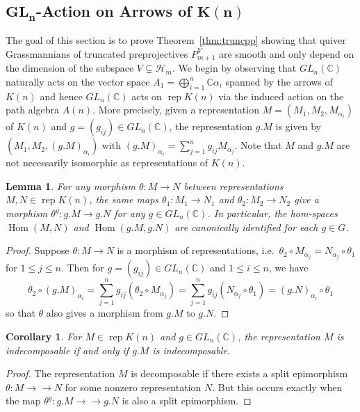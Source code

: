 \documentclass{amsart}
\newtheorem{corollary}[theorem]{Corollary}
\newtheorem{lemma}[theorem]{Lemma}
\numberwithin{equation}{section}
\newcommand{\CC}{\mathbb{C}}
\newcommand{\cH}{\mathcal{H}}
\newcommand{\onto}{\to\!\!\!\!\!\to}
\newcommand{\Hom}{\operatorname{Hom}}
\newcommand{\rep}{\operatorname{rep}}
\begin{document}
\subsection{\texorpdfstring{$\mathbf{GL_n}$}{Gln}-Action on Arrows of \texorpdfstring{$\mathbf{K(n)}$}{K(n)}}
The goal of this section is to prove Theorem~\ref{thm:truncpp} showing that quiver Grassmannians of truncated preprojectives $P_{m+1}^V$ are smooth and only depend on the dimension of the subspace $V\subsetneq \cH_m$.
We begin by observing that $GL_n(\CC)$ naturally acts on the vector space $A_1=\bigoplus_{i=1}^n \CC\alpha_i$ spanned by the arrows of $K(n)$ and hence $GL_n(\CC)$ acts on $\rep K(n)$ via the induced action on the path algebra $A(n)$.
More precisely, given a representation $M=(M_1,M_2,M_{\alpha_i})$ of $K(n)$ and $g=(g_{ij})\in GL_n(\CC)$, the representation $g.M$ is given by $(M_1,M_2,(g.M)_{\alpha_i})$ with $(g.M)_{\alpha_i}=\sum\limits_{j=1}^n g_{ij}M_{\alpha_j}$.
Note that $M$ and $g.M$ are not necessarily isomorphic as representations of $K(n)$.
\begin{lemma}
  \label{le:hom equivariance}
  For any morphism $\theta:M\to N$ between representations $M,N\in\rep K(n)$, the same maps $\theta_1:M_1\to N_1$ and $\theta_2:M_2\to N_2$ give a morphism $\theta^g:g.M\to g.N$ for any $g\in GL_n(\CC)$.
  In particular, the hom-spaces $\Hom(M,N)$ and $\Hom(g.M,g.N)$ are canonically identified for each $g\in G$.
\end{lemma}
\begin{proof}
  Suppose $\theta:M\to N$ is a morphism of representations, i.e.\ $\theta_2\circ M_{\alpha_j}=N_{\alpha_j}\circ\theta_1$ for $1\le j\le n$.
  Then for $g=(g_{ij})\in GL_n(\CC)$ and $1\le i\le n$, we have
  \[\theta_2\circ (g.M)_{\alpha_i}=\sum\limits_{j=1}^n g_{ij}(\theta_2\circ M_{\alpha_j})=\sum\limits_{j=1}^n g_{ij}(N_{\alpha_j}\circ\theta_1)=(g.N)_{\alpha_i}\circ\theta_1\]
  so that $\theta$ also gives a morphism from $g.M$ to $g.N$. 
\end{proof}
\begin{corollary}
  \label{cor:indecomposability}
  For $M\in\rep K(n)$ and $g\in GL_n(\CC)$, the representation $M$ is indecomposable if and only if $g.M$ is indecomposable.
\end{corollary}
\begin{proof}
  The representation $M$ is decomposable if there exists a split epimorphism $\theta:M\onto N$ for some nonzero representation $N$.
  But this occurs exactly when the map $\theta^g:g.M\onto g.N$ is also a split epimorphism.
\end{proof}
\end{document}
